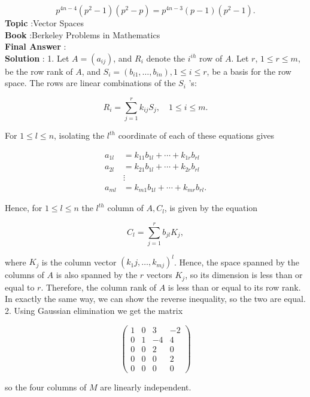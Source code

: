 \documentclass[10pt]{article}
\begin{document}
$$
p^{4 n-4}\left(p^{2}-1\right)\left(p^{2}-p\right)=p^{4 n-3}(p-1)\left(p^{2}-1\right) .
$$
\textbf{Topic} :Vector Spaces \\
\textbf{Book} :Berkeley Problems in Mathematics\\
\textbf{Final Answer} :\\


\textbf{Solution} : 1. Let $A=\left(a_{i j}\right)$, and $R_{i}$ denote the $i^{i h}$ row of $A$. Let $r$, $1 \leqslant r \leqslant m$, be the row rank of $A$, and $S_{i}=\left(b_{i 1}, \ldots, b_{i n}\right), 1 \leqslant i \leqslant r$, be a basis for the row space. The rows are linear combinations of the $S_{i}$ 's:

$$
R_{i}=\sum_{j=1}^{r} k_{i j} S_{j}, \quad 1 \leqslant i \leqslant m .
$$

For $1 \leqslant l \leqslant n$, isolating the $l^{t h}$ coordinate of each of these equations gives

$$
\begin{aligned}
a_{1 l} &=k_{11} b_{1 l}+\cdots+k_{1 r} b_{r l} \\
a_{2 l} &=k_{21} b_{1 l}+\cdots+k_{2 r} b_{r l} \\
& \vdots \\
a_{m l} &=k_{m 1} b_{1 l}+\cdots+k_{m r} b_{r l} .
\end{aligned}
$$

Hence, for $1 \leqslant l \leqslant n$ the $l^{t h}$ column of $A, C_{l}$, is given by the equation

$$
C_{l}=\sum_{j=1}^{r} b_{j l} K_{j},
$$

where $K_{j}$ is the column vector $\left(k_{1} j, \ldots, k_{m j}\right)^{l}$. Hence, the space spanned by the columns of $A$ is also spanned by the $r$ vectors $K_{j}$, so its dimension is less than or equal to $r$. Therefore, the column rank of $A$ is less than or equal to its row rank. In exactly the same way, we can show the reverse inequality, so the two are equal. 2. Using Gaussian elimination we get the matrix

$$
\left(\begin{array}{cccc}
1 & 0 & 3 & -2 \\
0 & 1 & -4 & 4 \\
0 & 0 & 2 & 0 \\
0 & 0 & 0 & 2 \\
0 & 0 & 0 & 0
\end{array}\right)
$$

so the four columns of $M$ are linearly independent.
\end{document}
